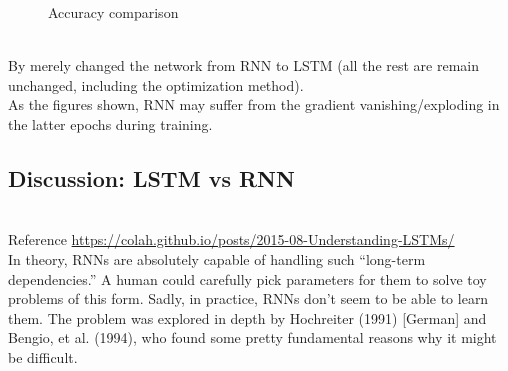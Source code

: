 \documentclass[11pt, a4paper]{article} %
\begin{document}
\begin{figure}[H]
    \hfill
    \caption{Accuracy comparison}
    \label{fig:my_label}
\end{figure}
\\ By merely changed the network from RNN to LSTM (all the rest are remain unchanged, including the optimization method).
\\ As the figures shown, RNN may suffer from the gradient vanishing/exploding in the latter epochs during training.

\subsection{Discussion: LSTM vs RNN}
\\ Reference \url{https://colah.github.io/posts/2015-08-Understanding-LSTMs/}
\\ In theory, RNNs are absolutely capable of handling such “long-term dependencies.” A human could carefully pick parameters for them to solve toy problems of this form. Sadly, in practice, RNNs don’t seem to be able to learn them. The problem was explored in depth by Hochreiter (1991) [German] and Bengio, et al. (1994), who found some pretty fundamental reasons why it might be difficult.
\end{document}
